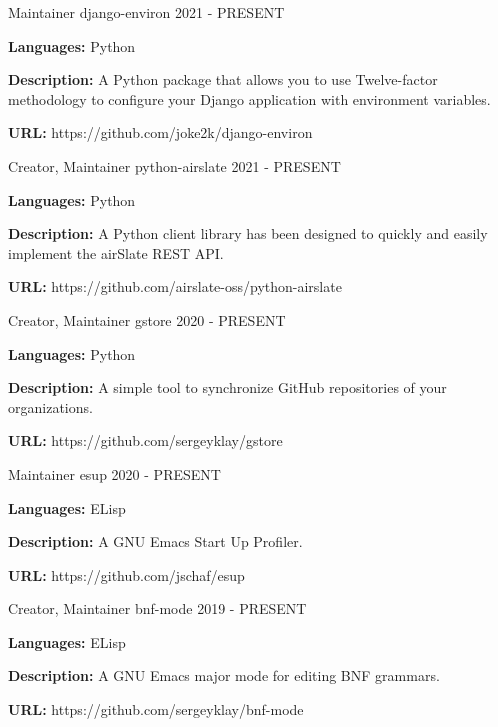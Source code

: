 
\begin{cventries}

  \cventry
    {Maintainer}
    {django-environ}
    {}
    {2021 - PRESENT}
    {
      \begin{cvitems}
        \item {\textbf{Languages:} Python}
        \item {\textbf{Description:} A Python package that allows you to use Twelve-factor methodology to configure your Django application with environment variables.}
        \item {\textbf{URL:} https://github.com/joke2k/django-environ}
      \end{cvitems}
    }

  \cventry
    {Creator, Maintainer}
    {python-airslate}
    {}
    {2021 - PRESENT}
    {
      \begin{cvitems}
        \item {\textbf{Languages:} Python}
        \item {\textbf{Description:} A Python client library has been designed to quickly and easily implement the airSlate REST API.}
        \item {\textbf{URL:} https://github.com/airslate-oss/python-airslate}
      \end{cvitems}
    }

  \cventry
    {Creator, Maintainer}
    {gstore}
    {}
    {2020 - PRESENT}
    {
      \begin{cvitems}
        \item {\textbf{Languages:} Python}
        \item {\textbf{Description:} A simple tool to synchronize GitHub repositories of your organizations.}
        \item {\textbf{URL:} https://github.com/sergeyklay/gstore}
      \end{cvitems}
    }

  \cventry
    {Maintainer}
    {esup}
    {}
    {2020 - PRESENT}
    {
      \begin{cvitems}
        \item {\textbf{Languages:} ELisp}
        \item {\textbf{Description:} A GNU Emacs Start Up Profiler.}
        \item {\textbf{URL:} https://github.com/jschaf/esup}
      \end{cvitems}
    }

  \cventry
    {Creator, Maintainer}
    {bnf-mode}
    {}
    {2019 - PRESENT}
    {
      \begin{cvitems}
        \item {\textbf{Languages:} ELisp}
        \item {\textbf{Description:} A GNU Emacs major mode for editing BNF grammars.}
        \item {\textbf{URL:} https://github.com/sergeyklay/bnf-mode}
      \end{cvitems}
    }


\end{cventries}
